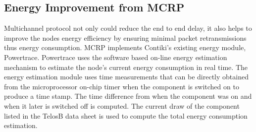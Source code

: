 \subsection{Energy Improvement from MCRP}


Multichannel protocol not only could reduce the end to end delay, it also helps to improve the nodes energy efficiency by ensuring minimal packet retransmissions thus energy consumption.
MCRP implements Contiki's existing energy module, Powertrace.
Powertrace uses the software based on-line energy estimation mechanism \cite{dunkels2007software} to estimate the node's current energy consumption in real time. 
The energy estimation module uses time measurements that can be directly obtained from the microprocessor on-chip timer when the component is switched on to produce a time stamp. The time difference from when the component was on and when it later is switched off is computed. The current draw of the component listed in the TelosB data sheet is used to compute the total energy consumption estimation. 

